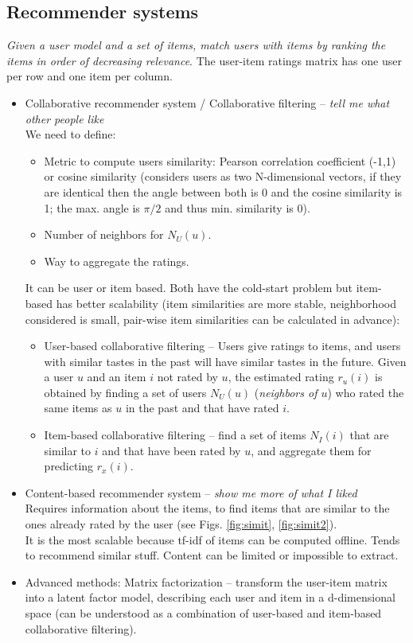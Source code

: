 \subsection{Recommender systems} %
\label{sub:recommender_systems}
	\emph{Given a user model and a set of items, match users with items by ranking the items in order of decreasing relevance}. The user-item ratings matrix has one user per row and one item per column.
	\begin{itemize}
		\item Collaborative recommender system / Collaborative filtering -- \emph{tell me what other people like}\\
		We need to define:
		\begin{itemize}
			\item Metric to compute users similarity: Pearson correlation coefficient (-1,1) or cosine similarity (considers users as two N-dimensional vectors, if they are identical then the angle between both is 0 and the cosine similarity is 1; the max. angle is $\pi/2$ and thus min. similarity is 0).
			\item Number of neighbors for $N_U(u)$.
			\item Way to aggregate the ratings.
		\end{itemize}
		It can be user or item based. Both have the cold-start problem but item-based has better scalability (item similarities are more stable, neighborhood considered is small, pair-wise item similarities can be calculated in advance):
		\begin{itemize}
			\item User-based collaborative filtering -- Users give ratings to items, and users with similar tastes in the past will have similar tastes in the future. Given a user $u$ and an item $i$ not rated by $u$, the estimated rating $r_u(i)$ is obtained by finding a set of users $N_U(u)$ (\emph{neighbors of $u$}) who rated the same items as $u$ in the past and that have rated $i$.
			\item Item-based collaborative filtering -- find a set of items $N_I(i)$ that are similar to $i$ and that have been rated by $u$, and aggregate them for predicting $r_x(i)$.
		\end{itemize}
		\item  Content-based recommender system -- \emph{show me more of what I liked}\\
		Requires information about the items, to find items that are similar to the ones already rated by the user (see Figs. \ref{fig:simit}, \ref{fig:simit2}).\\
		It is the most scalable because tf-idf of items can be computed offline. Tends to recommend similar stuff. Content can be limited or impossible to extract.
		\item Advanced methods: Matrix factorization -- transform the user-item matrix into a latent factor model, describing each user and item in a d-dimensional space (can be understood as a combination of user-based and item-based collaborative filtering).
	\end{itemize}

